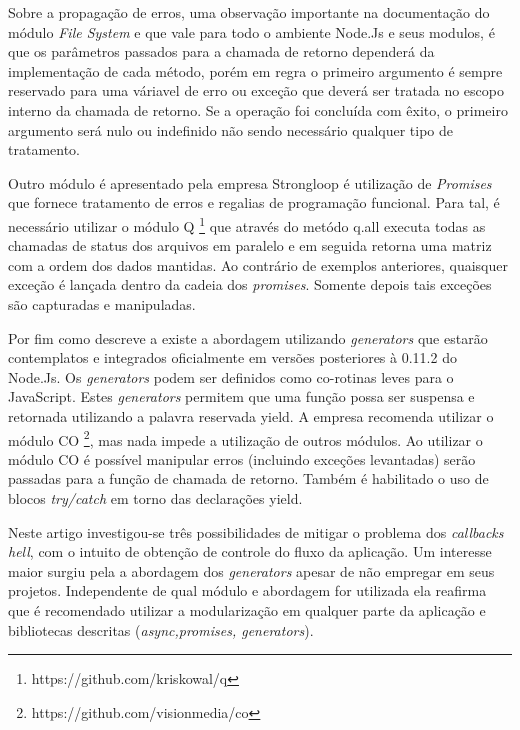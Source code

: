   Sobre a propagação de erros, uma observação importante na documentação do módulo \textit{File System} e que 
  vale para todo o ambiente Node.Js e seus modulos, é que os parâmetros passados para a chamada de retorno dependerá da 
  implementação de cada método, porém em regra o primeiro argumento é sempre reservado para uma váriavel de erro ou exceção 
  que deverá ser tratada no escopo interno da chamada de retorno. Se a operação foi concluída com êxito, o primeiro argumento 
  será nulo ou indefinido não sendo necessário qualquer tipo de tratamento. \cite{ModuleSystemFs:2014}
  
  Outro módulo é apresentado pela empresa Strongloop é utilização de \textit{Promises} que fornece tratamento de erros
  e regalias de programação funcional. Para tal, é necessário utilizar o módulo Q \footnote{https://github.com/kriskowal/q}
  que através do metódo q.all executa todas as chamadas de status dos arquivos em paralelo e em seguida retorna uma matriz
  com a ordem dos dados mantidas. Ao contrário de exemplos anteriores, quaisquer exceção é lançada dentro da cadeia dos
  \textit{promises}. Somente depois tais exceções são capturadas e manipuladas.
  
  Por fim como descreve a  existe a abordagem utilizando \textit{generators} que estarão
  contemplatos e integrados oficialmente em versões posteriores à 0.11.2 do Node.Js. Os \textit{generators} podem ser definidos
  como co-rotinas leves para o JavaScript. Estes \textit{generators} permitem que uma função possa ser suspensa e retornada
  utilizando a palavra reservada yield. A empresa recomenda utilizar o módulo CO \footnote{https://github.com/visionmedia/co},
  mas nada impede a utilização de outros módulos. Ao utilizar o módulo CO é possível manipular erros (incluindo exceções levantadas)
  serão passadas para a função de chamada de retorno. Também é habilitado o uso de blocos \textit{try/catch} em torno das 
  declarações yield.
  
  Neste artigo  investigou-se três possibilidades de mitigar o problema dos \textit{callbacks hell}, com o 
  intuito de obtenção de controle do fluxo da aplicação. Um interesse maior surgiu pela a abordagem dos \textit{generators}
  apesar de não empregar em seus projetos. Independente de qual módulo e abordagem for utilizada ela reafirma que é recomendado
  utilizar a modularização em qualquer parte da aplicação e bibliotecas descritas (\textit{async,promises, generators}).
  
